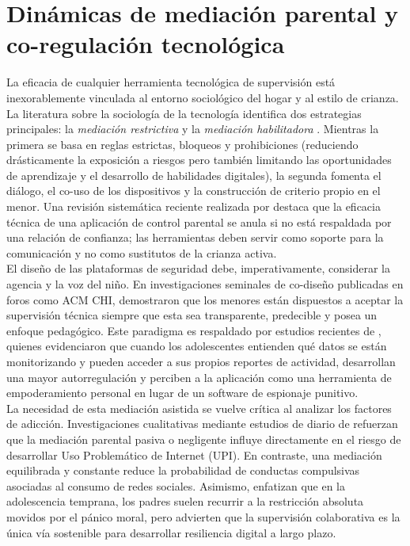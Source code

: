 \section{Dinámicas de mediación parental y co-regulación tecnológica}

La eficacia de cualquier herramienta tecnológica de supervisión está inexorablemente vinculada al entorno sociológico del hogar y al estilo de crianza. La literatura sobre la sociología de la tecnología identifica dos estrategias principales: la \textit{mediación restrictiva} y la \textit{mediación habilitadora} \cite{livingstone_maximizing_2017}. Mientras la primera se basa en reglas estrictas, bloqueos y prohibiciones (reduciendo drásticamente la exposición a riesgos pero también limitando las oportunidades de aprendizaje y el desarrollo de habilidades digitales), la segunda fomenta el diálogo, el co-uso de los dispositivos y la construcción de criterio propio en el menor. Una revisión sistemática reciente realizada por \cite{banic_comparison_2024} destaca que la eficacia técnica de una aplicación de control parental se anula si no está respaldada por una relación de confianza; las herramientas deben servir como soporte para la comunicación y no como sustitutos de la crianza activa.\\



El diseño de las plataformas de seguridad debe, imperativamente, considerar la agencia y la voz del niño. En investigaciones seminales de co-diseño publicadas en foros como ACM CHI, \cite{mcnally_co-designing_2018} demostraron que los menores están dispuestos a aceptar la supervisión técnica siempre que esta sea transparente, predecible y posea un enfoque pedagógico. Este paradigma es respaldado por estudios recientes de \cite{dumaru_its_2024}, quienes evidenciaron que cuando los adolescentes entienden qué datos se están monitorizando y pueden acceder a sus propios reportes de actividad, desarrollan una mayor autorregulación y perciben a la aplicación como una herramienta de empoderamiento personal en lugar de un software de espionaje punitivo.\\

La necesidad de esta mediación asistida se vuelve crítica al analizar los factores de adicción. Investigaciones cualitativas mediante estudios de diario de \cite{theopilus_parental_2025} refuerzan que la mediación parental pasiva o negligente influye directamente en el riesgo de desarrollar Uso Problemático de Internet (UPI). En contraste, una mediación equilibrada y constante reduce la probabilidad de conductas compulsivas asociadas al consumo de redes sociales. Asimismo, \cite{allison_parental_2025} enfatizan que en la adolescencia temprana, los padres suelen recurrir a la restricción absoluta movidos por el pánico moral, pero advierten que la supervisión colaborativa es la única vía sostenible para desarrollar resiliencia digital a largo plazo. \\

